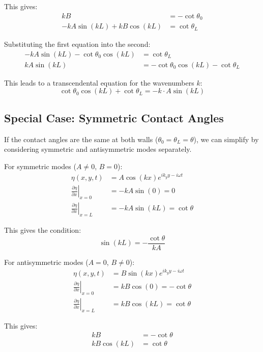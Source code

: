 \documentclass[12pt,a4paper]{article}
\begin{document}
This gives:
\begin{align}
kB &= -\cot\theta_0 \\
-kA\sin(kL) + kB\cos(kL) &= \cot\theta_L
\end{align}

Substituting the first equation into the second:
\begin{align}
-kA\sin(kL) - \cot\theta_0\cos(kL) &= \cot\theta_L \\
kA\sin(kL) &= -\cot\theta_0\cos(kL) - \cot\theta_L
\end{align}

This leads to a transcendental equation for the wavenumbers $k$:
\begin{equation}
\cot\theta_0\cos(kL) + \cot\theta_L = -k\cdot A\sin(kL)
\end{equation}

\subsection{Special Case: Symmetric Contact Angles}
If the contact angles are the same at both walls ($\theta_0 = \theta_L = \theta$), we can simplify by considering symmetric and antisymmetric modes separately.

For symmetric modes ($A \neq 0$, $B = 0$):
\begin{align}
\eta(x,y,t) &= A\cos(kx)e^{ik_y y - i\omega t} \\
\left.\frac{\partial \eta}{\partial x}\right|_{x=0} &= -kA\sin(0) = 0 \\
\left.\frac{\partial \eta}{\partial x}\right|_{x=L} &= -kA\sin(kL) = \cot\theta
\end{align}

This gives the condition:
\begin{equation}
\sin(kL) = -\frac{\cot\theta}{kA}
\end{equation}

For antisymmetric modes ($A = 0$, $B \neq 0$):
\begin{align}
\eta(x,y,t) &= B\sin(kx)e^{ik_y y - i\omega t} \\
\left.\frac{\partial \eta}{\partial x}\right|_{x=0} &= kB\cos(0) = -\cot\theta \\
\left.\frac{\partial \eta}{\partial x}\right|_{x=L} &= kB\cos(kL) = \cot\theta
\end{align}

This gives:
\begin{align}
kB &= -\cot\theta \\
kB\cos(kL) &= \cot\theta
\end{align}
\end{document}
